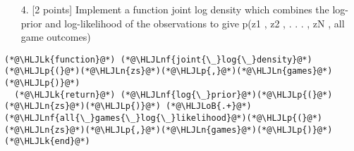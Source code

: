\documentclass[12pt,a4paper]{article}
\newcommand{\HLJLk}[1]{\textcolor[RGB]{148,91,176}{\textbf{#1}}}
\newcommand{\HLJLn}[1]{#1}
\newcommand{\HLJLnf}[1]{\textcolor[RGB]{66,102,213}{#1}}
\newcommand{\HLJLoB}[1]{\textcolor[RGB]{102,102,102}{\textbf{#1}}}
\newcommand{\HLJLp}[1]{#1}
\begin{document}
\begin{itemize}
\item[4. ] [2 points] Implement a function joint log density which combines the log-prior and log-likelihood of the observations to give p(z1 , z2 , . . . ,  zN , all game outcomes)

\end{itemize}

\begin{lstlisting}
(*@\HLJLk{function}@*) (*@\HLJLnf{joint{\_}log{\_}density}@*)(*@\HLJLp{(}@*)(*@\HLJLn{zs}@*)(*@\HLJLp{,}@*)(*@\HLJLn{games}@*)(*@\HLJLp{)}@*)
  (*@\HLJLk{return}@*) (*@\HLJLnf{log{\_}prior}@*)(*@\HLJLp{(}@*)(*@\HLJLn{zs}@*)(*@\HLJLp{)}@*) (*@\HLJLoB{.+}@*) (*@\HLJLnf{all{\_}games{\_}log{\_}likelihood}@*)(*@\HLJLp{(}@*)(*@\HLJLn{zs}@*)(*@\HLJLp{,}@*)(*@\HLJLn{games}@*)(*@\HLJLp{)}@*)
(*@\HLJLk{end}@*)


\end{lstlisting}
\end{document}
